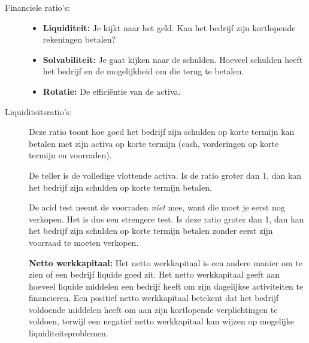 \documentclass[a4paper,11pt]{article}
\begin{document}
\begin{description}

    \item[Financiele ratio's:\newline]
          \begin{itemize}
              \item \textbf{Liquiditeit:} Je kijkt naar het geld. Kan het bedrijf zijn
                    kortlopende rekeningen betalen?
              \item \textbf{Solvabiliteit:} Je gaat kijken naar de schulden. Hoeveel schulden heeft het bedrijf en de mogelijkheid
                    om die terug te betalen.
              \item \textbf{Rotatie:} De efficiëntie van de activa.
          \end{itemize}

    \item[Liquiditeitsratio's:] Deze ratio toont hoe goed het bedrijf zijn schulden op korte termijn
          kan betalen met zijn activa op korte termijn (cash, vorderingen op korte termijn en voorraden).

          {De teller is de volledige vlottende activa. Is de ratio groter dan 1, dan kan het bedrijf
              zijn schulden op korte termijn betalen.}

          De acid test neemt de voorraden \emph{niet} mee, want die moet je eerst nog verkopen.
          Het is dus een strengere test.
          {Is deze ratio groter dan 1, dan kan het bedrijf zijn schulden op korte termijn betalen
              zonder eerst zijn voorraad te moeten verkopen.}

          \textbf{Netto werkkapitaal:}
          Het netto werkkapitaal is een andere manier om te zien of een bedrijf liquide goed zit.
          {Het netto werkkapitaal geeft aan hoeveel liquide middelen een bedrijf heeft om zijn dagelijkse
              activiteiten te financieren. Een positief netto werkkapitaal betekent dat het bedrijf voldoende
              middelen heeft om aan zijn kortlopende verplichtingen te voldoen,
              terwijl een negatief netto werkkapitaal
              kan wijzen op mogelijke liquiditeitsproblemen.}


\end{description}
\end{document}
